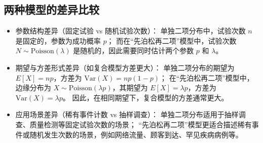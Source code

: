 \documentclass{article}
\begin{document}
\subsection{两种模型的差异比较}
\begin{itemize}
    \item 参数结构差异（固定试验 vs 随机试验次数）：  
        单独二项分布中，试验次数 $ n $ 是固定的，参数为成功概率 $ p $；  
        而在“先泊松再二项”模型中，试验次数 $ N \sim \text{Poisson}(\lambda) $ 是随机的，因此需要同时估计两个参数 $ p $ 和 $ \lambda $。

    \item 期望与方差形式差异（如复合模型方差更大）：  
        单独二项分布的期望为 $ E[X] = np $，方差为 $ \text{Var}(X) = np(1-p) $；  
        在“先泊松再二项”模型中，边缘分布为 $ X \sim \text{Poisson}(\lambda p) $，其期望为 $ E[X] = \lambda p $，方差为 $ \text{Var}(X) = \lambda p $。  
        因此，在相同期望下，复合模型的方差通常更大。

    \item 应用场景差异（稀有事件计数 vs 抽样调查）：  
        单独二项分布适用于抽样调查、质量检测等固定试验次数的场景；  
        “先泊松再二项”模型更适合描述稀有事件或随机发生次数的场景，例如网络流量、顾客到达、罕见疾病病例等。
\end{itemize}
\end{document}
